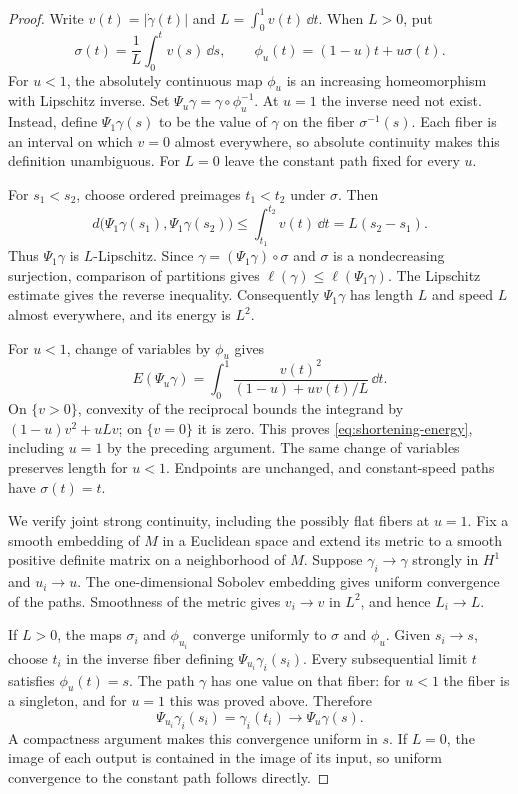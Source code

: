 \begin{proof}
Write $v(t)=|\dot\gamma(t)|$ and $L=\int_0^1v(t)\,\dd t$.
When $L>0$, put
\[
 \sigma(t)=\frac1L\int_0^t v(s)\,\dd s,
 \qquad \phi_u(t)=(1-u)t+u\sigma(t).
\]
For $u<1$, the absolutely continuous map $\phi_u$ is an increasing
homeomorphism with Lipschitz inverse.  Set
$\Psi_u\gamma=\gamma\circ\phi_u^{-1}$.
At $u=1$ the inverse need not exist.  Instead, define
$\Psi_1\gamma(s)$ to be the value of $\gamma$ on the fiber
$\sigma^{-1}(s)$.  Each fiber is an interval on which $v=0$ almost
everywhere, so absolute continuity makes this definition unambiguous.
For $L=0$ leave the constant path fixed for every $u$.

For $s_1<s_2$, choose ordered preimages $t_1<t_2$ under $\sigma$.  Then
\[
 d\bigl(\Psi_1\gamma(s_1),\Psi_1\gamma(s_2)\bigr)
 \le\int_{t_1}^{t_2}v(t)\,\dd t=L(s_2-s_1).
\]
Thus $\Psi_1\gamma$ is $L$-Lipschitz.  Since
$\gamma=(\Psi_1\gamma)\circ\sigma$ and $\sigma$ is a nondecreasing
surjection, comparison of partitions gives
$\ell(\gamma)\le\ell(\Psi_1\gamma)$.  The Lipschitz estimate gives the
reverse inequality.  Consequently $\Psi_1\gamma$ has length $L$ and speed
$L$ almost everywhere, and its energy is $L^2$.

For $u<1$, change of variables by $\phi_u$ gives
\[
 E(\Psi_u\gamma)
 =\int_0^1\frac{v(t)^2}{(1-u)+uv(t)/L}\,\dd t.
\]
On $\{v>0\}$, convexity of the reciprocal bounds the integrand by
$(1-u)v^2+uLv$; on $\{v=0\}$ it is zero.  This proves
\eqref{eq:shortening-energy}, including $u=1$ by the preceding argument.
The same change of variables preserves length for $u<1$.  Endpoints are
unchanged, and constant-speed paths have $\sigma(t)=t$.

We verify joint strong continuity, including the possibly flat fibers at
$u=1$.  Fix a smooth embedding of $M$ in a Euclidean space and extend its
metric to a smooth positive definite matrix on a neighborhood of $M$.
Suppose $\gamma_i\to\gamma$ strongly in $H^1$ and $u_i\to u$.
The one-dimensional Sobolev embedding gives uniform convergence of the
paths.  Smoothness of the metric gives $v_i\to v$ in $L^2$, and hence
$L_i\to L$.

If $L>0$, the maps $\sigma_i$ and $\phi_{u_i}$ converge uniformly to
$\sigma$ and $\phi_u$.  Given $s_i\to s$, choose $t_i$ in the inverse
fiber defining $\Psi_{u_i}\gamma_i(s_i)$.  Every subsequential limit $t$
satisfies $\phi_u(t)=s$.  The path $\gamma$ has one value on that fiber:
for $u<1$ the fiber is a singleton, and for $u=1$ this was proved above.
Therefore
\[
 \Psi_{u_i}\gamma_i(s_i)=\gamma_i(t_i)
 \longrightarrow\Psi_u\gamma(s).
\]
A compactness argument makes this convergence uniform in $s$.  If $L=0$,
the image of each output is contained in the image of its input, so uniform
convergence to the constant path follows directly.


\end{proof}
